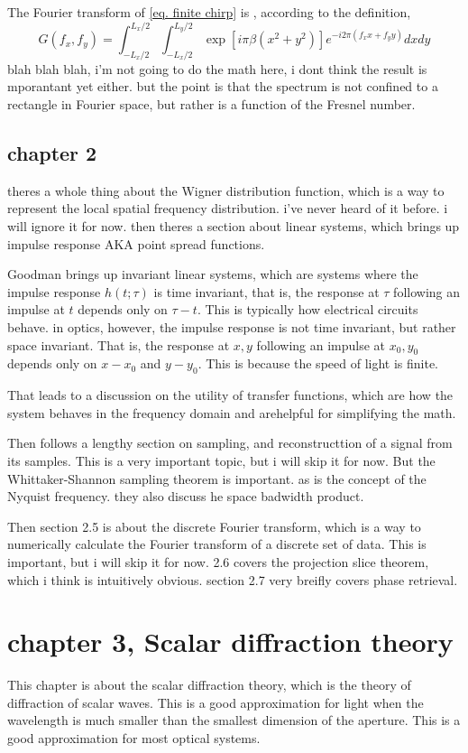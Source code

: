 \documentclass[../../main.tex]{subfiles}
\begin{document}
The Fourier transform of \ref{eq. finite chirp} is , according to the definition, 
\begin{equation}\label{eq. finite chirp transform}
    G(f_x,f_y)=\int_{-L_x/2}^{L_x/2}\int_{-L_x/2}^{L_y/2}\exp{\left[i\pi\beta(x^2+y^2)\right]}e^{-i2\pi(f_xx+f_yy)}dxdy
\end{equation}
blah blah blah, i'm not going to do the math here, i dont think the result is mporantant yet either. but the point is that the spectrum is not confined to a rectangle in Fourier space, but rather is a function of the Fresnel number.

\subsection{chapter 2 }
theres a whole thing about the Wigner distribution function, which is a way to represent the local spatial frequency distribution. i've never heard of it before. i will ignore it for now. then theres a section about linear systems, which brings up impulse response AKA point spread functions. 

Goodman brings up invariant linear systems, which are systems where the impulse response $h(t;\tau)$ is time invariant, that is, the response at $\tau$ following an impulse at $t$ depends only on $\tau-t$. This is typically how electrical circuits behave. in optics, however, the impulse response is not time invariant, but rather space invariant. That is, the response at $x,y$ following an impulse at $x_0,y_0$ depends only on $x-x_0$ and $y-y_0$. This is because the speed of light is finite. 

That leads to a discussion on the utility of transfer functions, which are how the system behaves in the frequency domain and arehelpful for simplifying the math. 

Then follows a lengthy section on sampling, and reconstructtion of a signal from its samples. This is a very important topic, but i will skip it for now. But the Whittaker-Shannon sampling theorem is important. as is the concept of the Nyquist frequency. they also discuss he space badwidth product.

Then section 2.5 is about the discrete Fourier transform, which is a way to numerically calculate the Fourier transform of a discrete set of data. This is important, but i will skip it for now. 2.6 covers the projection slice theorem,  which i think is intuitively obvious. section 2.7 very breifly covers phase retrieval. 

\section{chapter 3, Scalar diffraction theory}
This chapter is about the scalar diffraction theory, which is the theory of diffraction of scalar waves. This is a good approximation for light when the wavelength is much smaller than the smallest dimension of the aperture. This is a good approximation for most optical systems.
\end{document}
